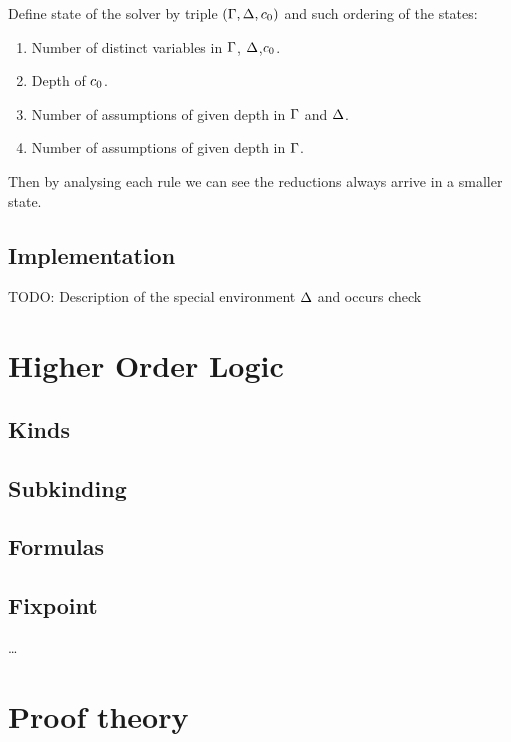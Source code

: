 \documentclass[english, mgr]{iithesis}
\begin{document}
Define state of the solver by triple $(\Gamma, \Delta, c_0)$ and such
ordering of the states:
\begin{enumerate}
  \item Number of distinct variables in $\Gamma$, $\Delta$,$ c_0$.
  \item Depth of $c_0$.
  \item Number of assumptions of given depth in $\Gamma$ and $\Delta$.
  \item Number of assumptions of given depth in $\Gamma$.
\end{enumerate}

Then by analysing each rule we can see the reductions always arrive in a smaller
state.

\section{Implementation}

TODO: Description of the special environment  $\Delta$ and occurs check

\chapter{Higher Order Logic}

\section{Kinds}
\section{Subkinding}

\section{Formulas}

\section{Fixpoint}


\dots

\chapter{Proof theory}
\end{document}
